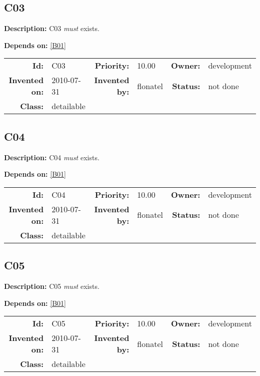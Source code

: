 \subsection{C03}\label{C03}
\textbf{Description:} C03 \textsl{must} exists.

\textbf{Depends on:} \ref{B01} 

\par
{\small \begin{center}\begin{tabular}{rlrlrl}
\textbf{Id:} & C03  & \textbf{Priority:} & 10.00  & \textbf{Owner:} & development\\ 
\textbf{Invented on:} & 2010-07-31  & \textbf{Invented by:} & flonatel  & \textbf{Status:} & not done \\ 
\textbf{Class:} & detailable  & & & \end{tabular}\end{center} }

\subsection{C04}\label{C04}
\textbf{Description:} C04 \textsl{must} exists.

\textbf{Depends on:} \ref{B01} 

\par
{\small \begin{center}\begin{tabular}{rlrlrl}
\textbf{Id:} & C04  & \textbf{Priority:} & 10.00  & \textbf{Owner:} & development\\ 
\textbf{Invented on:} & 2010-07-31  & \textbf{Invented by:} & flonatel  & \textbf{Status:} & not done \\ 
\textbf{Class:} & detailable  & & & \end{tabular}\end{center} }

\subsection{C05}\label{C05}
\textbf{Description:} C05 \textsl{must} exists.

\textbf{Depends on:} \ref{B01} 

\par
{\small \begin{center}\begin{tabular}{rlrlrl}
\textbf{Id:} & C05  & \textbf{Priority:} & 10.00  & \textbf{Owner:} & development\\ 
\textbf{Invented on:} & 2010-07-31  & \textbf{Invented by:} & flonatel  & \textbf{Status:} & not done \\ 
\textbf{Class:} & detailable  & & & \end{tabular}\end{center} }

